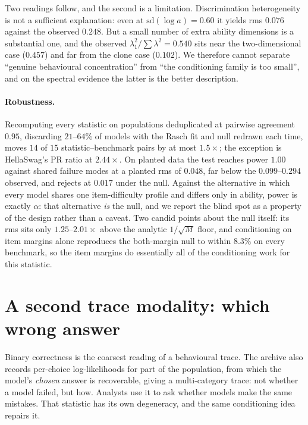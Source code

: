 \documentclass{article}
\begin{document}
Two readings follow, and the second is a limitation. Discrimination heterogeneity is not a
sufficient explanation: even at $\mathrm{sd}(\log a)=0.60$ it yields rms $0.076$ against the
observed $0.248$. But a small number of extra ability dimensions is a substantial one, and the
observed $\lambda_1^2/\sum\lambda^2=0.540$ sits near the two-dimensional case ($0.457$) and far
from the clone case ($0.102$). We therefore cannot separate ``genuine behavioural concentration''
from ``the conditioning family is too small'', and on the spectral evidence the latter is the
better description.

\paragraph{Robustness.} Recomputing every statistic on populations deduplicated at pairwise
agreement $0.95$, discarding $21$--$64\%$ of models with the Rasch fit and null redrawn each time,
moves $14$ of $15$ statistic--benchmark pairs by at most $1.5\times$; the exception is HellaSwag's
PR ratio at $2.44\times$. On planted data the test reaches power $1.00$ against shared failure modes
at a planted rms of $0.048$, far below the $0.099$--$0.294$ observed, and rejects at $0.017$ under
the null. Against the alternative in which every model shares one item-difficulty profile and
differs only in ability, power is exactly $\alpha$: that alternative \emph{is} the null, and we
report the blind spot as a property of the design rather than a caveat. Two candid points about the
null itself: its rms sits only $1.25$--$2.01\times$ above the analytic $1/\sqrt{M}$ floor, and
conditioning on item margins alone reproduces the both-margin null to within $8.3\%$ on every
benchmark, so the item margins do essentially all of the conditioning work for this statistic.

\section{A second trace modality: which wrong answer}
\label{sec:multicat}

Binary correctness is the coarsest reading of a behavioural trace. The archive also records
per-choice log-likelihoods for part of the population, from which the model's \emph{chosen} answer
is recoverable, giving a multi-category trace: not whether a model failed, but how. Analysts use it
to ask whether models make the same mistakes. That statistic has its own degeneracy, and the same
conditioning idea repairs it.
\end{document}
